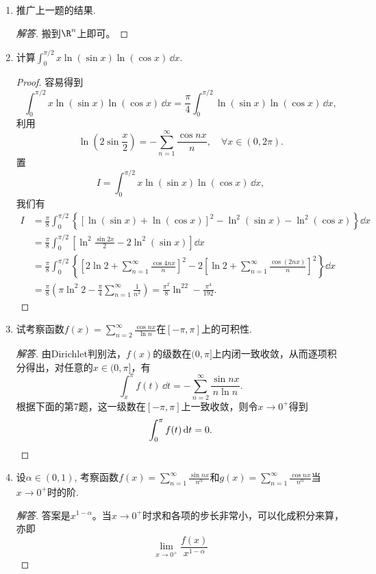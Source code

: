 \begin{quizb}
\begin{enumerate}
\begin{proof}
(2) $f$是连续的周期函数从而一致连续，故$\delta$的选取是一致的；
且$f$有界，从而不用担心$f(y)-f(x_0)$中的$x_0$变为$x$带来的问题。(1)的证明加这两句话就适用于(2)了。
\end{proof}
\item 推广上一题的结果.
\begin{proof}[解答]
搬到$\R^n$上即可。
\end{proof}
\item 计算\(\int_{0}^{\pi/2}x\ln(\sin x)\ln(\cos x)\,\dd x.\)
\begin{proof}
容易得到\[\int_{0}^{\pi/2}x\ln(\sin x)\ln(\cos x)\,\dd x
=\frac{\pi}{4}\int_{0}^{\pi/2}\ln(\sin x)\ln(\cos x)\,\dd x,\]
利用\[\ln\left(2\sin\frac{x}{2}\right)=-\sum_{n=1}^{\infty}\frac{\cos nx}{n},\quad \forall x\in (0,2\pi).\]
置\[I=\int_{0}^{\pi/2}x\ln(\sin x)\ln(\cos x)\,\dd x,\]
我们有\[\begin{split}
I&=\frac{\pi}{8}\int_{0}^{\pi/2}\left\lbrace\left[\ln(\sin x)+\ln(\cos x)\right]^2-\ln^2(\sin x)-\ln^2(\cos x) \right\rbrace\dd x\\
&=\frac{\pi}{8}\int_{0}^{\pi/2}\left[\ln^2\frac{\sin 2x}{2}-2\ln^2(\sin x)\right]\dd x\\
&=\frac{\pi}{8}\int_{0}^{\pi/2}\left\lbrace\left[2\ln 2+\sum_{n=1}^{\infty}\frac{\cos 4nx}{n}\right]^2-2\left[\ln 2+\sum_{n=1}^{\infty}\frac{\cos(2nx)}{n}\right]^2 \right\rbrace\dd x\\
&=\frac{\pi}{8}\left(\pi\ln^2 2-\frac{\pi}{4}\sum_{n=1}^{\infty}\frac{1}{n^2}\right)=\frac{\pi^2}{8}\ln^22-\frac{\pi^4}{192}.
\end{split}\]
\end{proof}
\item 试考察函数\(f(x)=\sum_{n=2}^{\infty}\frac{\cos nx}{\ln n}\)在\([-\pi,\pi]\)上的可积性.
\begin{proof}[解答]
    由Dirichlet判别法，$f(x)$的级数在$(0,\pi]$上内闭一致收敛，从而逐项积分得出，对任意的$x\in(0,\pi]$，有
    \[\int_x^\pi f(t)\,\dd t=-\sum_{n=2}^\infty\frac{\sin nx}{n\ln n}.\]
    根据下面的第7题，这一级数在$[-\pi,\pi]$上一致收敛，则令$x\to0^+$得到
    \[\int_0^\pi f(t)\,{\rm d} t=0.\qedhere\]
\end{proof}
\item 设\(\alpha\in(0,1)\), 考察函数\(f(x)=\sum_{n=1}^{\infty}\frac{\sin nx}{n^\alpha}\)和\(g(x)=\sum_{n=1}^{\infty}\frac{\cos nx}{n^\alpha}\)当\(x\rightarrow 0^+\)时的阶.
\begin{proof}[解答]
    答案是$x^{1-\alpha}$。当$x\to0^+$时求和各项的步长非常小，可以化成积分来算，亦即
    \[\lim_{x\to0^+}\frac{f(x)}{x^{1-\alpha}}
\]
\end{proof}
\end{enumerate}
\end{quizb}
